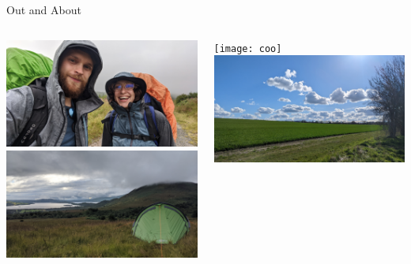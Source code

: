 \documentclass[10pt]{beamer}
\begin{document}
  \begin{frame}{Out and About}
    \begin{columns}
        \includegraphics[width=\textwidth]{rain}\\
        \vspace{0.2cm}
        \includegraphics[width=\textwidth]{wild-camp}

        \texttt{[image: coo]}\\
        \vspace{0.2cm}
        \includegraphics[width=\textwidth]{sunny}
    \end{columns}
  \end{frame}
\end{document}
